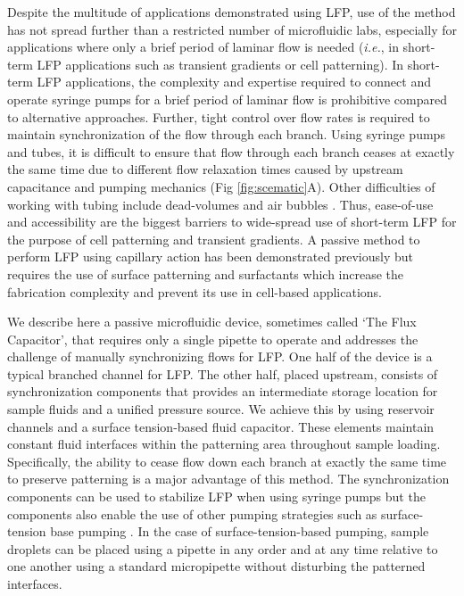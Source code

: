 Despite the multitude of applications demonstrated using LFP, use of the method has not spread further than a restricted number of microfluidic labs, especially for applications where only a brief period of laminar flow is needed (\emph{i.e.}, in short-term LFP applications such as transient gradients or cell patterning). In short-term LFP applications, the complexity and expertise required to connect and operate syringe pumps for a brief period of laminar flow is prohibitive compared to alternative approaches. Further, tight control over flow rates is required to maintain synchronization of the flow through each branch. Using syringe pumps and tubes, it is difficult to ensure that flow through each branch ceases at exactly the same time due to different flow relaxation times caused by upstream capacitance and pumping mechanics (Fig \ref{fig:scematic}A). Other difficulties of working with tubing include dead-volumes and air bubbles \cite{Paguirigan:2008xe}. Thus, ease-of-use and accessibility are the biggest barriers to wide-spread use of short-term LFP for the purpose of cell patterning and transient gradients. A passive method to perform LFP using capillary action has been demonstrated \cite{Kim:2005fk} previously but requires the use of surface patterning and surfactants which increase the fabrication complexity and prevent its use in cell-based applications. 

We describe here a passive microfluidic device, sometimes called `The Flux Capacitor', that requires only a single pipette to operate and addresses the challenge of manually synchronizing flows for LFP. One half of the device is a typical branched channel for LFP. The other half, placed upstream, consists of synchronization components that  provides an intermediate storage location for sample fluids and a unified pressure source. We achieve this by using reservoir channels and a surface tension-based fluid capacitor. These elements maintain constant fluid interfaces within the patterning area throughout sample loading. Specifically, the ability to cease flow down each branch at exactly the same time to preserve patterning is a major advantage of this method. The synchronization components can be used to stabilize LFP when using syringe pumps but the components also enable the use of other pumping strategies such as surface-tension base pumping \cite{Walker:2002ez}. In the case of surface-tension-based pumping, sample droplets can be placed using a pipette in any order and at any time relative to one another using a standard micropipette without disturbing the patterned interfaces.

